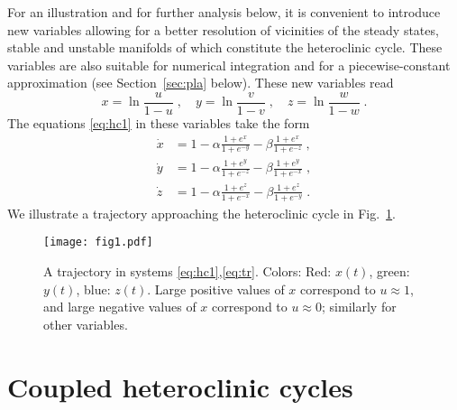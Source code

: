 \documentclass[3p,number,review,sort&compress]{elsarticle}
\begin{document}
For an illustration and for further analysis below, it is convenient
to introduce new variables allowing for a better resolution of vicinities
of the steady states, stable and unstable manifolds of which constitute the heteroclinic cycle. These variables are also suitable for numerical
integration and for a piecewise-constant approximation (see Section~\ref{sec:pla} below).
These new variables read
\begin{equation}
    x=\ln\frac{u}{1-u}\;,\quad y=\ln\frac{v}{1-v}\;,\quad z=\ln\frac{w}{1-w}\;.
\label{eq:xyzvar}    
\end{equation}
The equations \eqref{eq:hc1} in these variables take the form
\begin{equation}
\begin{aligned}
\dot x &=1-\alpha \frac{1+e^x}{1+e^{-y}}-\beta \frac{1+e^x}{1+e^{-z}}\;,\\
\dot y&=1-\alpha \frac{1+e^y}{1+e^{-z}}-\beta \frac{1+e^y}{1+e^{-x}}\;,\\
\dot z&=1-\alpha \frac{1+e^z}{1+e^{-x}}-\beta \frac{1+e^z}{1+e^{-y}}\;.
\end{aligned}
\label{eq:tr}
\end{equation}
We illustrate a trajectory approaching the heteroclinic cycle
in Fig.~\ref{fig:c}.
\begin{figure}[!htb]
\centering
\texttt{[image: fig1.pdf]}
\caption{A trajectory in systems \eqref{eq:hc1},\eqref{eq:tr}. 
Colors: Red: $x(t)$, green: $y(t)$, blue: $z(t)$. Large positive values
of $x$ correspond to $u\approx 1$, and large negative values of $x$ correspond to $u\approx 0$;
similarly for other variables.}
\label{fig:c}
\end{figure}

\section{Coupled heteroclinic cycles}
\label{sec:chc}
\end{document}
